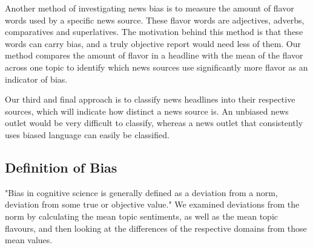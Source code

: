 \documentclass[final]{ieee}
\begin{document}
Another method of investigating news bias is to measure the amount of flavor words used by a specific news source. These flavor words are adjectives, adverbs, comparatives and superlatives. The motivation behind this method is that these words can carry bias, and a truly objective report would need less of them. Our method compares the amount of flavor in a headline with the mean of the flavor across one topic to identify which news sources use significantly more flavor as an indicator of bias.

Our third and final approach is to classify news headlines into their respective sources, which will indicate how distinct a news source is. An unbiased news outlet would be very difficult to classify, whereas a news outlet that consistently uses biased language can easily be classified.



     


\subsection{Definition of Bias}
"Bias in cognitive science is generally defined as a deviation from a norm, deviation from some true or objective value."
We examined deviations from the norm by calculating the mean topic sentiments, as well as the mean topic flavours, and then looking at the differences of the respective domains from those mean values.
\end{document}
